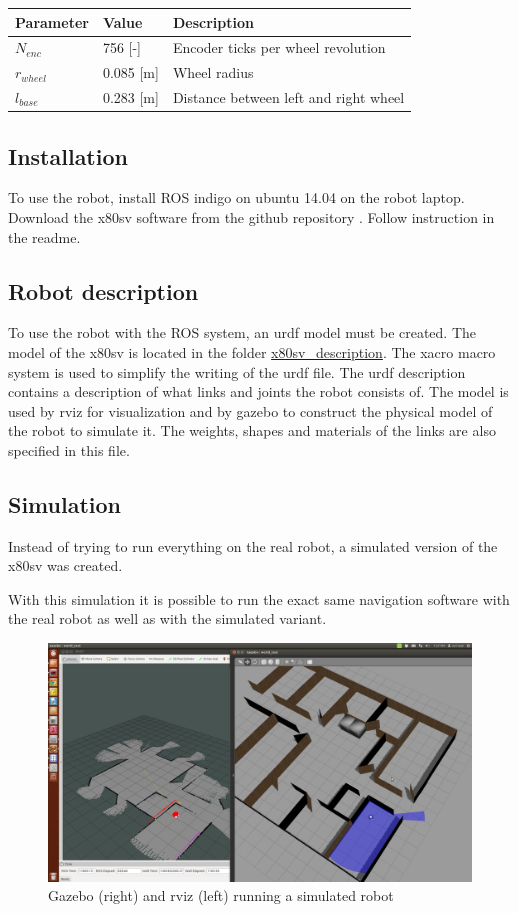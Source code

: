 \documentclass[a4paper]{article}
\begin{document}
\begin{tabular}{ | l | l | l |}
  \hline                       
  Parameter & Value & Description\\
  \hline 
  \hline 
  $N_{enc}$ & 756 [-] & Encoder ticks per wheel revolution \\
  \hline
  $r_{wheel}$ & 0.085 [m] & Wheel radius\\
  \hline
  $l_{base}$ & 0.283 [m] & Distance between left and right wheel\\
  \hline
\end{tabular}

\subsection{Installation}
To use the robot, install ROS indigo on ubuntu 14.04 on the robot laptop. Download the 
x80sv software from the github repository \cite{x80sv}. Follow 
instruction in the readme.

\subsection{Robot description}
To use the robot with the ROS system, an urdf model must be created. The model of the x80sv is
located in the folder \url{x80sv_description}. The xacro macro system is used to simplify the
writing of the urdf file. The urdf description contains a description of what links and joints
the robot consists of. The model is used by rviz for visualization and by gazebo to construct
the physical model of the robot to simulate it. The weights, shapes and materials of the links
are also specified in this file.


\subsection{Simulation}
Instead of trying to run everything on the real robot, a simulated version of the x80sv
was created.

With this simulation it is possible to run the exact same navigation software with the real
robot as well as with the simulated variant.

\begin{figure}[h!]
  \centering
  \includegraphics[width=\textwidth,height=\textheight,keepaspectratio]{img/office_sim_testgmapping.png}
  \caption{Gazebo (right) and rviz (left) running a simulated robot}
\end{figure}
\end{document}
